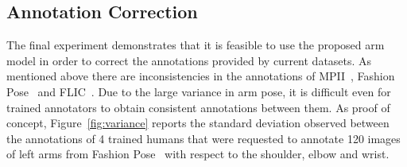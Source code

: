 
\subsection{Annotation Correction}
\label{exp:qualitative}
The final experiment demonstrates that it is feasible to use the proposed arm model in order to correct the annotations provided by current datasets. As mentioned above there are inconsistencies in the annotations of MPII~\cite{andriluka14cvpr}, Fashion Pose~\cite{dantone2013human} and FLIC~\cite{sapp2013modec}. Due to the large variance in arm pose, it is difficult even for trained annotators to obtain consistent annotations between them. As proof of concept, Figure~\ref{fig:variance} reports the standard deviation observed between the annotations of 4 trained humans that were requested to annotate 120 images of left arms from Fashion Pose~\cite{dantone2013human} with respect to the shoulder, elbow and wrist.

